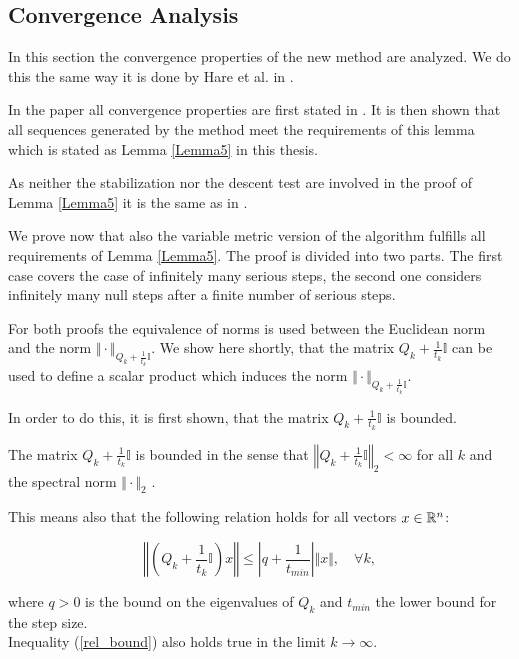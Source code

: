 \subsection{Convergence Analysis}

In this section the convergence properties of the new method are analyzed. We do this the same way it is done by Hare et al. in \cite{Hare2016}.

In the paper all convergence properties are first stated in \cite[Lemma 5]{Hare2016}. It is then shown that all sequences generated by the method meet the requirements of this lemma which is stated as Lemma \ref{Lemma5} in this thesis.

As neither the stabilization nor the descent test are involved in the proof of Lemma \ref{Lemma5} it is the same as in \cite{Hare2016}.

We prove now that also the variable metric version of the algorithm fulfills all requirements of Lemma \ref{Lemma5}.
The proof is divided into two parts. The first case covers the case of infinitely many serious steps, the second one considers infinitely many null steps after a finite number of serious steps.


For both proofs the equivalence of norms is used between the Euclidean norm and the norm \(\Vert \cdot \Vert_{Q_k+\frac{1}{t_k}\mathbb{I}}\).
We show here shortly, that the matrix \(Q_k+\frac{1}{t_k}\mathbb{I}\) can be used to define a scalar product which induces the norm \(\Vert \cdot \Vert_{Q_k+\frac{1}{t_k}\mathbb{I}}\).

In order to do this, it is first shown, that the matrix \(Q_k+\frac{1}{t_k}\mathbb{I}\) is bounded.

\begin{proposition}
\label{prop_bounded}
	The matrix \(Q_k+\frac{1}{t_k}\mathbb{I}\) is bounded in the sense that \(\left\Vert Q_k+\frac{1}{t_k}\mathbb{I} \right\Vert_2 < \infty \) for all \(k\) and the spectral norm \(\Vert \cdot \Vert_2\) \cite[Example 5.6.6]{Horn2012}.
	
	This means also that the following relation holds for all vectors \(x\in\mathbb{R}^n\):
	
	\begin{equation}
		\left\Vert\left(Q_k+\frac{1}{t_k}\mathbb{I}\right)x\right\Vert \leq \left\vert q + \frac{1}{t_{min}} \right\vert \Vert x\Vert , \quad \forall k,
		\label{rel_bound}
	\end{equation}
	
	where \(q > 0\) is the bound on the eigenvalues of \(Q_k\) and \(t_{min}\) the lower bound for the step size. \\
	Inequality (\ref{rel_bound}) also holds true in the limit \(k \to \infty\).
\end{proposition}

